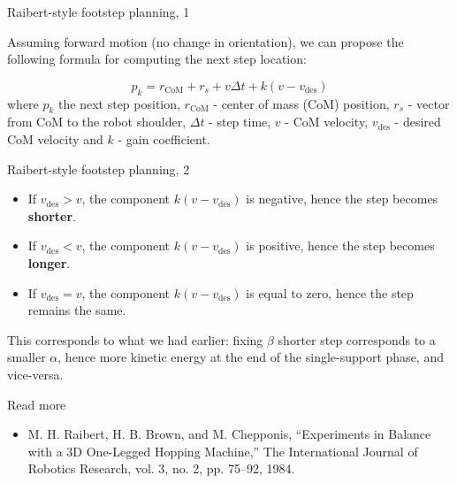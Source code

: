 \documentclass{beamer}
\begin{document}
\begin{frame}{Raibert-style footstep planning, 1}
	\begin{flushleft}
		
		Assuming forward motion (no change in orientation), we can propose the following formula for computing the next step location:
		
		\begin{equation}
			p_k = r_\text{CoM} +  r_s + v \Delta t + k (v - v_\text{des})
		\end{equation}
		where $p_k$ the next step position, $r_\text{CoM}$ - center of mass (CoM) position, $r_s$ - vector from CoM to the robot shoulder,  $\Delta t$ - step time, $v$ - CoM velocity, $v_\text{des}$ - desired CoM velocity and $k$ - gain coefficient.
		
		
	\end{flushleft}
\end{frame}


\begin{frame}{Raibert-style footstep planning, 2}
	\begin{flushleft}
		
		\begin{itemize}
			\item If $v_\text{des} > v$, the component $ k (v - v_\text{des})$ is negative, hence the step becomes \textbf{shorter}.
			
			\item If $v_\text{des} < v$, the component $ k (v - v_\text{des})$ is positive, hence the step becomes \textbf{longer}.
			
			\item If $v_\text{des} = v$, the component $ k (v - v_\text{des})$ is equal to zero, hence the step remains the same.
		\end{itemize}
	
		\bigskip
		
		This corresponds to what we had earlier: fixing $\beta$ shorter step corresponds to a smaller $\alpha$, hence more kinetic energy at the end of the single-support phase, and vice-versa.
		
	\end{flushleft}
\end{frame}





\begin{frame}{Read more}
	\begin{itemize}
		\item M. H. Raibert, H. B. Brown, and M. Chepponis, “Experiments in Balance with a 3D One-Legged Hopping Machine,” The International Journal of Robotics Research, vol. 3, no. 2, pp. 75–92, 1984.
		
	\end{itemize}
\end{frame}



\myqrframe
\end{document}
